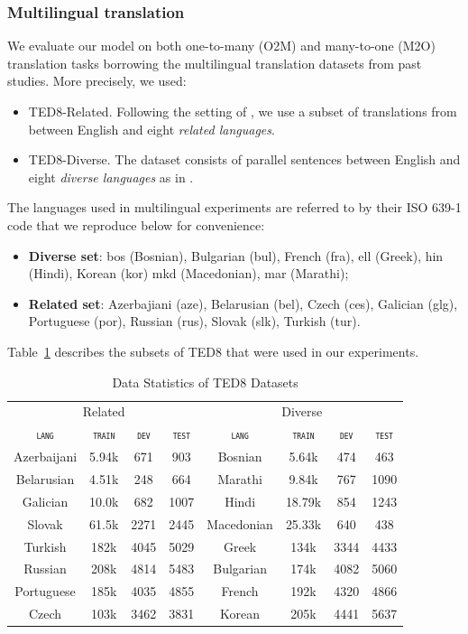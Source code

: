 \documentclass[11pt]{article}
\newcommand{\domain}[1]{\texttt{\textsc{#1}}}
\begin{document}
\subsubsection{Multilingual translation}
We evaluate our model on both one-to-many (O2M) and many-to-one (M2O)
translation tasks borrowing the multilingual translation datasets from past studies. More precisely, we used: 
\begin{itemize}
\item TED8-Related. Following the setting of \citet{Wang20balancing}, we use a subset of translations from \citet{qi18when} between English and eight \emph{related languages}.
\item TED8-Diverse. The dataset consists of parallel sentences between English and eight \emph{diverse languages} as in \citet{Wang20balancing}.
\end{itemize}

The languages used in multilingual experiments are referred to by their ISO 639-1 code that we reproduce below for convenience:
\begin{itemize}
\item \textbf{Diverse set}: bos (Bosnian), Bulgarian (bul), French (fra), ell (Greek),
  hin (Hindi), Korean (kor) mkd (Macedonian), mar (Marathi);
\item \textbf{Related set}: Azerbajiani (aze), Belarusian (bel),
  Czech (ces), Galician (glg), Portuguese (por), Russian (rus), Slovak (slk), Turkish (tur).
\end{itemize}

Table~\ref{tab:Corpora-multilingual} describes the subsets of TED8 that were used in our experiments.
\begin{table}[h]
  \centering
  \begin{tabular}{|cccc||cccc|} 
  \hline
    \multicolumn{4}{|c||}{Related} & \multicolumn{4}{c|}{Diverse} \\
                            \multicolumn{1}{|c}{\domain{lang}} & \multicolumn{1}{c}{\domain{train}} & \multicolumn{1}{c}{\domain{dev}} & \multicolumn{1}{c||}{\domain{test}} & \multicolumn{1}{c}{\domain{lang}} & \multicolumn{1}{c}{\domain{train}} & \multicolumn{1}{c}{\domain{dev}} & \multicolumn{1}{c|}{\domain{test}} \\
    \hline 
    Azerbaijani & 5.94k & 671 & 903 & Bosnian & 5.64k & 474 & 463 \\
    Belarusian & 4.51k & 248 & 664 & Marathi & 9.84k & 767 & 1090\\
    Galician & 10.0k & 682 & 1007 & Hindi & 18.79k & 854 & 1243\\
    Slovak & 61.5k & 2271 & 2445 & Macedonian & 25.33k & 640 & 438 \\
    Turkish & 182k & 4045 & 5029 & Greek & 134k & 3344 & 4433\\
    Russian & 208k & 4814 & 5483 &  Bulgarian & 174k & 4082 & 5060 \\
    Portuguese & 185k & 4035 & 4855 & French & 192k & 4320 & 4866\\
    Czech & 103k & 3462 & 3831 & Korean & 205k & 4441 & 5637 \\
    \hline
  \end{tabular}
  \caption{Data Statistics of TED8 Datasets}
\label{tab:Corpora-multilingual}
\end{table}
\end{document}
